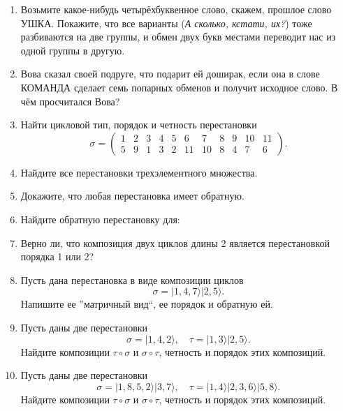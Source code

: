 \begin{enumerate}
    \item Возьмите какое-нибудь четырёхбуквенное слово, скажем, прошлое слово \textsf{УШКА}.
        Покажите, что все варианты (\emph{А сколько, кстати, их?}) тоже разбиваются на две группы,
        и обмен двух букв местами переводит нас из одной группы в другую.
    \item Вова сказал своей подруге, что подарит ей доширак,
        если она в слове \textsf{КОМАНДА} сделает семь попарных обменов и получит исходное слово.
        В чём просчитался Вова?
    \item Найти цикловой тип, порядок и четность перестановки
        \[
            \sigma = \begin{pmatrix}
                1 & 2 & 3 & 4 & 5 & 6 & 7 & 8 & 9 & 10 & 11 \\
                5 & 9 & 1 & 3 & 2 & 11 & 10 & 8 & 4 & 7 & 6
            \end{pmatrix}.
        \]
    \item Найдите все перестановки трехэлементного множества.
    \item Докажите, что любая перестановка имеет обратную.
    \item Найдите обратную перестановку для: 

    \item Верно ли, что композиция двух циклов длины 2 является перестановкой порядка 1 или 2?
    \item Пусть дана перестановка в виде композиции циклов  \[
            \sigma = | 1, 4, 7 \rangle |2, 5 \rangle
        .\]  
        Напишите ее ''матричный вид``, ее порядок и обратную ей.
    \item Пусть даны две перестановки \[
            \sigma = | 1, 4, 2 \rangle 
            , \quad
            \tau = | 1, 3 \rangle | 2, 5 \rangle
        .\]
        Найдите композиции $\tau \circ \sigma$ и $\sigma \circ \tau$, четность и порядок этих композиций.
    \item Пусть даны две перестановки \[
            \sigma = | 1, 8, 5, 2 \rangle | 3, 7 \rangle
            , \quad
            \tau = | 1, 4\rangle |2,  3, 6 \rangle | 5, 8 \rangle
            .
        \]
        Найдите композиции $\tau \circ \sigma$ и $\sigma \circ \tau$, четность и порядок этих композиций.

\end{enumerate}
